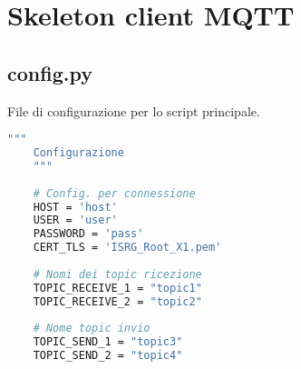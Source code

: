 

\chapter{Skeleton client MQTT}
\label{ch:client-appendix}

\section*{config.py}
\label{sec:client-appendix-subpub-conf}
File di configurazione per lo script principale.
\begin{lstlisting}[language=bash]
    """
    Configurazione 
    """
    
    # Config. per connessione
    HOST = 'host'
    USER = 'user'
    PASSWORD = 'pass'
    CERT_TLS = 'ISRG_Root_X1.pem'
    
    # Nomi dei topic ricezione
    TOPIC_RECEIVE_1 = "topic1"
    TOPIC_RECEIVE_2 = "topic2"
    
    # Nome topic invio
    TOPIC_SEND_1 = "topic3"
    TOPIC_SEND_2 = "topic4"
\end{lstlisting}


